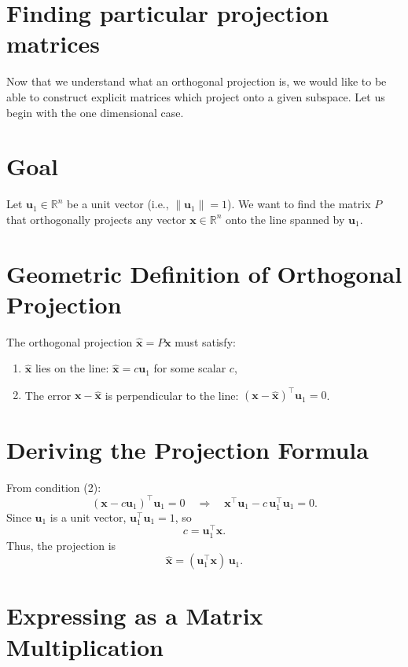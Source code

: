 \section{Finding particular projection matrices}



\Large

Now that we understand what an orthogonal projection is, we would like to be able to construct explicit matrices which project onto a given subspace. Let us begin with the one dimensional case.

\section*{Goal}

Let $ \mathbf{u}_1 \in \mathbb{R}^n $ be a unit vector (i.e., $ \|\mathbf{u}_1\| = 1 $).  
We want to find the matrix $ P $ that orthogonally projects any vector $ \mathbf{x} \in \mathbb{R}^n $ onto the line spanned by $ \mathbf{u}_1 $.

\section*{Geometric Definition of Orthogonal Projection}

The orthogonal projection $ \hat{\mathbf{x}} = P\mathbf{x} $ must satisfy:
\begin{enumerate}
    \item $ \hat{\mathbf{x}} $ lies on the line: $ \hat{\mathbf{x}} = c \mathbf{u}_1 $ for some scalar $ c $,
    \item The error $ \mathbf{x} - \hat{\mathbf{x}} $ is perpendicular to the line: $ (\mathbf{x} - \hat{\mathbf{x}})^\top \mathbf{u}_1 = 0 $.
\end{enumerate}

\section*{Deriving the Projection Formula}

From condition (2):
\[
(\mathbf{x} - c \mathbf{u}_1)^\top \mathbf{u}_1 = 0
\quad \Rightarrow \quad
\mathbf{x}^\top \mathbf{u}_1 - c \, \mathbf{u}_1^\top \mathbf{u}_1 = 0.
\]
Since $ \mathbf{u}_1 $ is a unit vector, $ \mathbf{u}_1^\top \mathbf{u}_1 = 1 $, so
\[
c = \mathbf{u}_1^\top \mathbf{x}.
\]
Thus, the projection is
\[
\hat{\mathbf{x}} = (\mathbf{u}_1^\top \mathbf{x}) \, \mathbf{u}_1.
\]

\section*{Expressing as a Matrix Multiplication}

